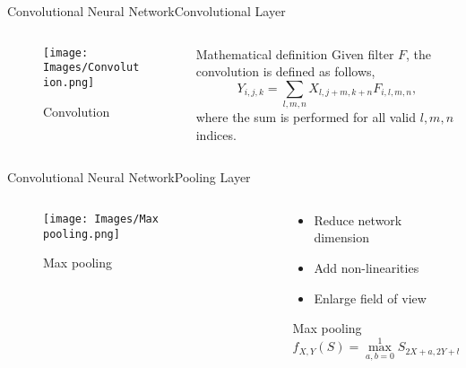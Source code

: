 \documentclass{beamer}
\begin{document}
\begin{frame}{Convolutional Neural Network}{Convolutional Layer}
  \begin{columns}
    \begin{column}{.5\textwidth}
      \begin{figure}
        \texttt{[image: Images/Convolution.png]}
        \caption{Convolution}
      \end{figure}
    \end{column}
    \begin{column}{.5\textwidth}
      \begin{block}{Mathematical definition}
        Given filter \(F\), the convolution is defined as follows,
        \begin{equation}
          Y_{i,j,k} = \sum_{l, m, n} X_{l, j + m, k + n} F_{i, l, m, n},
        \end{equation}
        where the sum is performed for all valid \(l, m, n\) indices.
      \end{block}
    \end{column}
  \end{columns}
\end{frame}

\begin{frame}{Convolutional Neural Network}{Pooling Layer}
  \begin{columns}
    \begin{column}{.5\textwidth}
      \begin{figure}
        \texttt{[image: Images/Max pooling.png]}
        \caption{Max pooling}
      \end{figure}
    \end{column}
    \begin{column}{.5\textwidth}
      \begin{itemize}
        \item Reduce network dimension
        \item Add non-linearities
        \item Enlarge field of view
      \end{itemize}
      \begin{block}{Max pooling}
        \begin{equation}
          f_{X, Y}(S) = \max_{a, b=0}^1 S_{2X + a, 2Y + b}
        \end{equation}
      \end{block}
    \end{column}
  \end{columns}
\end{frame}
\end{document}
